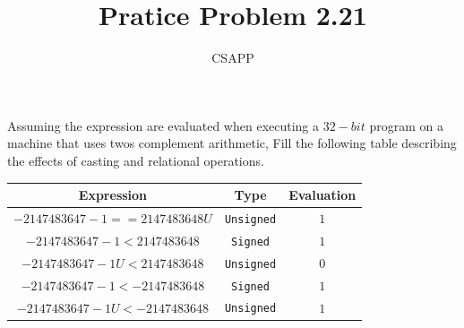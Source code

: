 \documentclass{article}
\title{Pratice Problem 2.21}
\author{CSAPP}
\begin{document}
    \maketitle
    \begin{flushleft}
        Assuming the expression are evaluated when executing a $32-bit$
        program on a machine that uses twos complement arithmetic, Fill
        the following table describing the effects of casting and relational
        operations.
        \smallbreak

        \begin{tabular}{ccc}
            Expression & Type & Evaluation\\
            \midrule
            $-2147483647 - 1 == 2147483648U$ & \texttt{Unsigned} & $1$\\
            $-2147483647 - 1 < 2147483648$   & \texttt{Signed}   & $1$\\
            $-2147483647 - 1U < 2147483648$  & \texttt{Unsigned} & $0$\\
            $-2147483647 - 1 < -2147483648$  & \texttt{Signed}   & $1$\\
            $-2147483647 - 1U < -2147483648$ & \texttt{Unsigned} & $1$
            
        \end{tabular}
    \end{flushleft}
\end{document}
